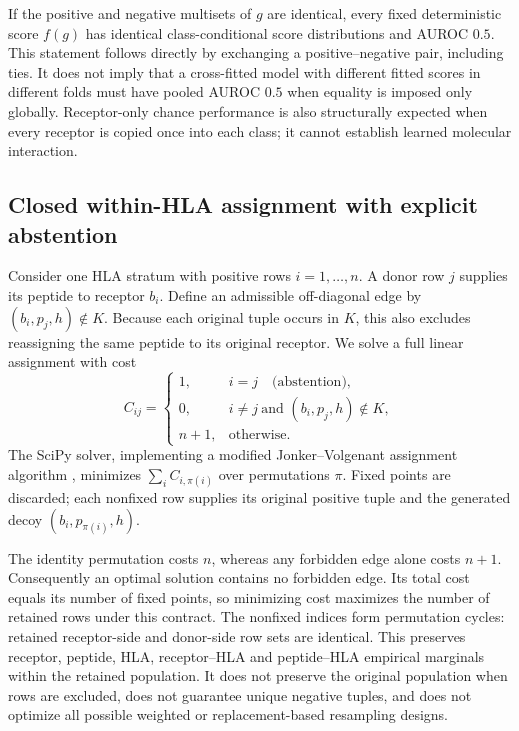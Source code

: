 \documentclass[pdflatex,sn-basic]{sn-jnl}
\begin{document}
If the positive and negative multisets of $g$ are identical, every fixed deterministic score $f(g)$ has identical class-conditional score distributions and AUROC $0.5$. This statement follows directly by exchanging a positive--negative pair, including ties. It does not imply that a cross-fitted model with different fitted scores in different folds must have pooled AUROC $0.5$ when equality is imposed only globally. Receptor-only chance performance is also structurally expected when every receptor is copied once into each class; it cannot establish learned molecular interaction.

\subsection{Closed within-HLA assignment with explicit abstention}
Consider one HLA stratum with positive rows $i=1,\ldots,n$. A donor row $j$ supplies its peptide to receptor $b_i$. Define an admissible off-diagonal edge by $(b_i,p_j,h)\notin K$. Because each original tuple occurs in $K$, this also excludes reassigning the same peptide to its original receptor. We solve a full linear assignment with cost
\begin{equation}
C_{ij}=\begin{cases}
1, & i=j\quad\text{(abstention)},\\
0, & i\ne j\ \text{and }(b_i,p_j,h)\notin K,\\
n+1, & \text{otherwise}.
\end{cases}
\label{eq:assignment}
\end{equation}
The SciPy solver, implementing a modified Jonker--Volgenant assignment algorithm \citep{Crouse2016}, minimizes $\sum_i C_{i,\pi(i)}$ over permutations $\pi$. Fixed points are discarded; each nonfixed row supplies its original positive tuple and the generated decoy $(b_i,p_{\pi(i)},h)$.

The identity permutation costs $n$, whereas any forbidden edge alone costs $n+1$. Consequently an optimal solution contains no forbidden edge. Its total cost equals its number of fixed points, so minimizing cost maximizes the number of retained rows under this contract. The nonfixed indices form permutation cycles: retained receptor-side and donor-side row sets are identical. This preserves receptor, peptide, HLA, receptor--HLA and peptide--HLA empirical marginals within the retained population. It does not preserve the original population when rows are excluded, does not guarantee unique negative tuples, and does not optimize all possible weighted or replacement-based resampling designs.
\end{document}
